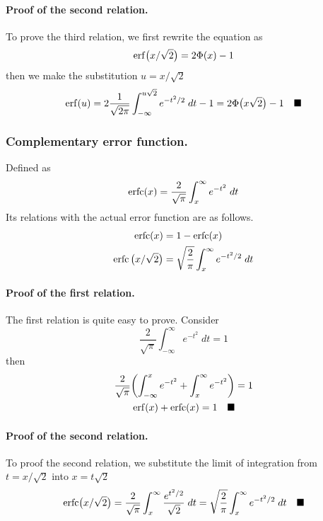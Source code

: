\documentclass[../../main.tex]{subfiles}
\begin{document}
\paragraph{Proof of the second relation.} To prove the third relation, we first rewrite the equation as
\begin{align*}
    \operatorname{erf}\bigl(x/\sqrt{2}\bigr)= 2\Phi(x)-1
\end{align*}
then we make the substitution $u=x/\sqrt{2}$
\begin{align*}
    \operatorname{erf}(u)= 2\frac{1}{\sqrt{2\pi}}\int_{-\infty}^{u\sqrt{2}} e^{-t^2/2}\;dt-1=2\Phi\bigl(x\sqrt{2}\bigr)-1\quad\blacksquare
\end{align*}

\subsubsection*{Complementary error function.} Defined as 
\begin{equation*}
    \operatorname{erfc}(x)=\frac{2}{\sqrt{\pi}}\int_{x}^{\infty}e^{-t^2}\;dt
\end{equation*}
Its relations with the actual error function are as follows.
\begin{align*}
    \operatorname{erfc}(x)&=1-\operatorname{erfc}(x)\\
    \operatorname{erfc}\big(x/\sqrt{2}\big)&=\sqrt{\frac{2}{\pi}}\int_{x}^{\infty}e^{-t^2/2}\;dt
\end{align*}

\paragraph{Proof of the first relation.} The first relation is quite easy to prove. Consider
\begin{equation*}
    \frac{2}{\sqrt{\pi}}\int_{-\infty}^{\infty}e^{-t^2}\;dt=1
\end{equation*}
then
\begin{align*}
    \frac{2}{\sqrt{\pi}}\biggl(\int_{-\infty}^{x}e^{-t^2}+\int_{x}^{\infty}e^{-t^2}\biggr)&=1\\
    \operatorname{erf}(x)+\operatorname{erfc}(x)=1\quad\blacksquare
\end{align*}

\paragraph{Proof of the second relation.} To proof the second relation, we substitute the limit of integration from $t=x/\sqrt{2}$ into $x=t\sqrt{2}$
\begin{align*}
    \operatorname{erfc}\bigl(x/\sqrt{2}\bigr)=\frac{2}{\sqrt{\pi}}\int_{x}^{\infty}\frac{e^{t^2/2}}{\sqrt{2}}\;dt=\sqrt{\frac{2}{\pi}}\int_{x}^{\infty}e^{-t^2/2}\;dt\quad\blacksquare
\end{align*}
\end{document}
